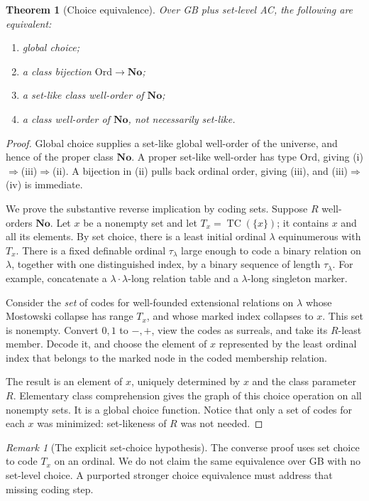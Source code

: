 \documentclass[11pt]{article}
\newtheorem{theorem}{Theorem}[section]
\theoremstyle{definition}
\theoremstyle{remark}
\newtheorem{remark}[remark]{Remark}
\newcommand{\No}{\mathbf{No}}
\newcommand{\Ord}{\mathrm{Ord}}
\begin{document}
\begin{theorem}[Choice equivalence]\label{swo:st:thm:choice}
Over GB plus set-level AC, the following are equivalent:
\begin{enumerate}[label=(\roman*)]
\item global choice;
\item a class bijection $\Ord\to\No$;
\item a set-like class well-order of $\No$;
\item a class well-order of $\No$, not necessarily set-like.
\end{enumerate}
\end{theorem}
\begin{proof}
Global choice supplies a set-like global well-order of the universe, and
hence of the proper class $\No$. A proper set-like well-order has type
$\Ord$, giving (i)$\Rightarrow$(iii)$\Rightarrow$(ii). A bijection in (ii)
pulls back ordinal order, giving (iii), and (iii)$\Rightarrow$(iv) is
immediate.

We prove the substantive reverse implication by coding sets. Suppose
$R$ well-orders $\No$. Let $x$ be a nonempty set and let
$T_x=\operatorname{TC}(\{x\})$; it contains $x$ and all its elements.
By set choice, there is a least initial ordinal $\lambda$ equinumerous
with $T_x$. There is a fixed definable ordinal $\tau_\lambda$ large
enough to code a binary relation on $\lambda$, together with one
distinguished index, by a binary sequence of length $\tau_\lambda$.
For example, concatenate a $\lambda\cdot\lambda$-long relation table
and a $\lambda$-long singleton marker.

Consider the \emph{set} of codes for well-founded extensional relations
on $\lambda$ whose Mostowski collapse has range $T_x$, and whose marked
index collapses to $x$. This set is nonempty. Convert $0,1$ to $-,+$,
view the codes as surreals, and take its $R$-least member. Decode it, and
choose the element of $x$ represented by the least ordinal index that
belongs to the marked node in the coded membership relation.

The result is an element of $x$, uniquely determined by $x$ and the class
parameter $R$. Elementary class comprehension gives the graph of this
choice operation on all nonempty sets. It is a global choice function.
Notice that only a set of codes for each $x$ was minimized: set-likeness
of $R$ was not needed.
\end{proof}

\begin{remark}[The explicit set-choice hypothesis]\label{swo:st:n4.2}
The converse proof uses set choice to code $T_x$ on an ordinal. We do not
claim the same equivalence over GB with no set-level choice. A purported
stronger choice equivalence must address that missing coding step.
\end{remark}
\end{document}
